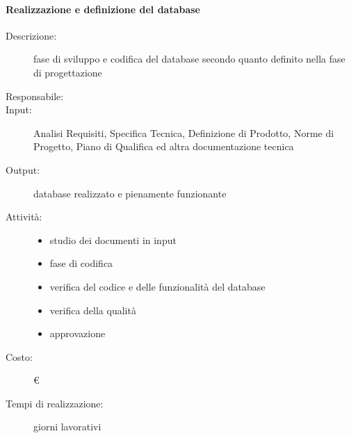 \paragraph{Realizzazione e definizione del database}
\begin{description}
\item[Descrizione:] fase di sviluppo e codifica del database secondo quanto definito nella fase
di progettazione

\item[Responsabile:] 

\item[Input:] Analisi Requisiti, Specifica Tecnica, Definizione di Prodotto, Norme di Progetto,
Piano di Qualifica ed altra documentazione tecnica

\item[Output:]database realizzato e pienamente funzionante
\item[Attività:]
\begin{itemize}
\item studio dei documenti in input
\item fase di codifica
\item verifica del codice e delle funzionalità del database
\item verifica della qualità
\item approvazione
\end{itemize}
\item[Costo:] \euro 
\item[Tempi di realizzazione:]  giorni lavorativi
\end{description}




